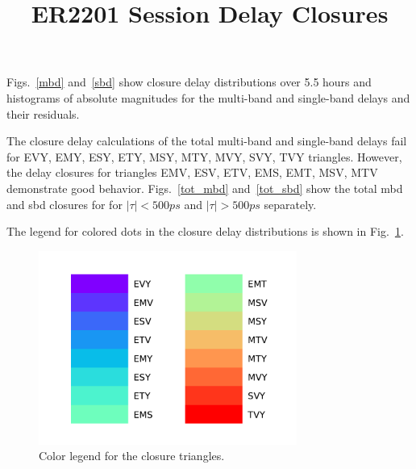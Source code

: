 \documentclass[letterpaper,twoside,12pt]{article}
\title{ER2201 Session Delay Closures}
\begin{document}
\maketitle

Figs.~\ref{mbd} and~\ref{sbd} show closure delay distributions over 5.5 hours and histograms of absolute magnitudes for the multi-band and single-band delays and their residuals.

The closure delay calculations of the total multi-band and single-band delays fail for EVY, EMY, ESY, ETY, MSY, MTY, MVY, SVY, TVY triangles. However, the delay closures for triangles EMV, ESV, ETV, EMS, EMT, MSV, MTV demonstrate good behavior. Figs.~\ref{tot_mbd} and~\ref{tot_sbd} show the total mbd and sbd closures for for $|\tau| < 500 ps$ and $|\tau| > 500 ps$ separately. 

The legend for colored dots in the closure delay distributions is shown in Fig.~\ref{col_legend}.


\begin{figure}[h!]
  \centering
  \includegraphics[width=20pc]{Triangle_color_legend.pdf}
  \caption{\small Color legend for the closure triangles.}
  \label{col_legend}
\end{figure}
\end{document}
